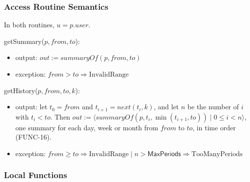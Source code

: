 \documentclass[12pt, titlepage]{article}
\begin{document}
\subsubsection{Access Routine Semantics}

\noindent In both routines, $u = p.\mathit{user}$.

\medskip

\noindent getSummary($p, \mathit{from}, \mathit{to}$):
\begin{itemize}
\item output: $\mathit{out} := \mathit{summaryOf}(p, \mathit{from},
  \mathit{to})$
\item exception: $\mathit{from} > \mathit{to} \Rightarrow
  \mathrm{InvalidRange}$
\end{itemize}

\noindent getHistory($p, \mathit{from}, \mathit{to}, k$):
\begin{itemize}
\item output: let $t_0 = \mathit{from}$ and $t_{i+1} = \mathit{next}(t_i,
  k)$, and let $n$ be the number of $i$ with $t_i < \mathit{to}$. Then
  $\mathit{out} := \langle \mathit{summaryOf}(p, t_i, \min(t_{i+1},
  \mathit{to})) \mid 0 \leq i < n \rangle$, one summary for each day, week
  or month from $\mathit{from}$ to $\mathit{to}$, in time order (FUNC-16).
\item exception: $\mathit{from} \geq \mathit{to} \Rightarrow
  \mathrm{InvalidRange} \mid n > \textsf{MaxPeriods} \Rightarrow
  \mathrm{TooManyPeriods}$
\end{itemize}

\subsubsection{Local Functions}
\end{document}
